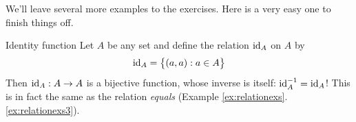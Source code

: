 We'll leave several more examples to the exercises. Here is a very easy one to finish things off.

\begin{example}{Identity function}{}
	Let $A$ be any set and define the relation $\operatorname{id}_A$ on $A$ by
	\[
		\operatorname{id}_A=\bigl\{(a,a):a\in A\bigr\}
	\]
	Then $\operatorname{id}_A:A\to A$ is a bijective function, whose inverse is itself: $\operatorname{id}_A^{-1}=\operatorname{id}_A$! This is in fact the same as the relation \emph{equals} (Example \ref*{ex:relationexs}.\ref{ex:relationexs3}). 
\end{example}

\goodbreak


